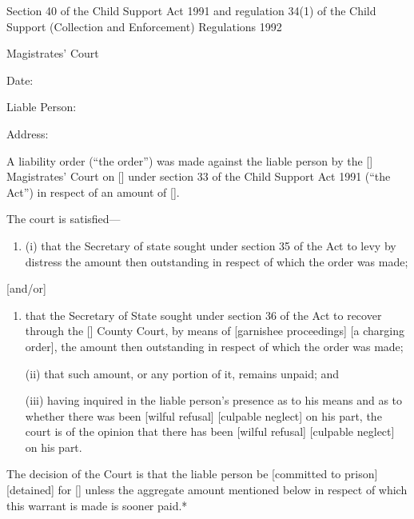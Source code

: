 \documentclass[12pt,a4paper]{article}
\begin{document}
\renewcommand\parthead{--- Schedule 3}

\noindent
Section 40 of the Child Support Act 1991 and regulation 34(1) of the Child Support (Collection and Enforcement) Regulations 1992

\medskip

{\raggedleft \hspace{0.5\linewidth}\dotfill Magistrates' Court

}

\medskip

Date:

\medskip

Liable Person:

\medskip

Address:

\medskip

A liability order (``the order'') was made against the liable person by the [\phantom{Bolton}] Magistrates' Court on [\phantom{\today}] under section 33 of the Child Support Act 1991 (``the Act'') in respect of an amount of [\phantom{£100.00}].

The court is satisfied---
\begin{enumerate}
\item[]
(i) that the Secretary of state sought under section 35 of the Act to levy by distress the amount then outstanding in respect of which the order was made;
\end{enumerate}
[and/or]
\begin{enumerate}\item[]
that the Secretary of State sought under section 36 of the Act to recover through the [\phantom{Bolton}] County Court, by means of [garnishee proceedings] 
[a charging order], the amount then outstanding in respect of which the order was made;

(ii) that such amount, or any portion of it, remains unpaid; and

(iii) having inquired in the liable person's presence as to his means and as to whether there was been [wilful refusal] 
[culpable neglect] on his part, the court is of the opinion that there has been [wilful refusal] 
[culpable neglect] on his part.
\end{enumerate}

The decision of the Court is that the liable person be [committed to prison] [detained] for [\phantom{7 days}] unless the aggregate amount mentioned below in respect of which this warrant is made is sooner paid.*
\end{document}
